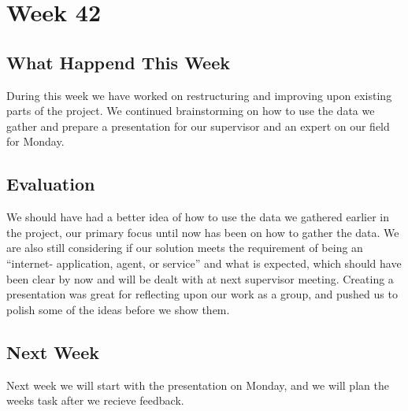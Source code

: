 \section*{Week 42}
\subsection*{What Happend This Week} 
During this week we have worked on restructuring and improving upon existing
parts of the project. We continued brainstorming on how to use the data we
gather and prepare a presentation for our supervisor and an expert on our field
for Monday.

\subsection*{Evaluation}
We should have had a better idea of how to use the data we gathered earlier in
the project, our primary focus until now has been on how to gather the data. We
are also still considering if our solution meets the requirement of being an
``internet- application, agent, or service'' and what is expected, which should
have been clear by now and will be dealt with at next supervisor meeting.
Creating a presentation was great for reflecting upon our work as a group, and
pushed us to polish some of the ideas before we show them.

\subsection*{Next Week}
Next week we will start with the presentation on Monday, and we will plan the
weeks task after we recieve feedback.


